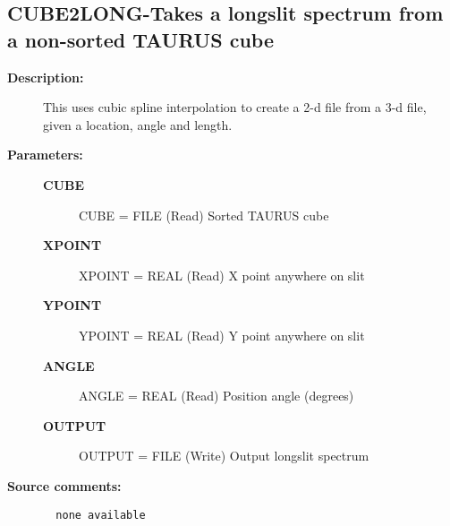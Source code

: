 \subsection{CUBE2LONG-\label{CUBE2LONG}Takes a longslit spectrum from a non-sorted TAURUS cube}
\begin{description}

\item [{\bf Description:}]
   This uses cubic spline interpolation to create a 2-d file from a 3-d
   file, given a location, angle and length.

\item [{\bf Parameters:}]
\begin{description}
\item [{\bf CUBE}]
  CUBE = FILE (Read)
        Sorted TAURUS cube
\item [{\bf XPOINT}]
  XPOINT = REAL (Read)
        X point anywhere on slit
\item [{\bf YPOINT}]
  YPOINT = REAL (Read)
        Y point anywhere on slit
\item [{\bf ANGLE}]
  ANGLE = REAL (Read)
        Position angle (degrees)
\item [{\bf OUTPUT}]
  OUTPUT = FILE (Write)
        Output longslit spectrum
\end{description}

\item [{\bf Source comments:}]
\begin{verbatim}
  none available

\end{verbatim}
\end{description}

